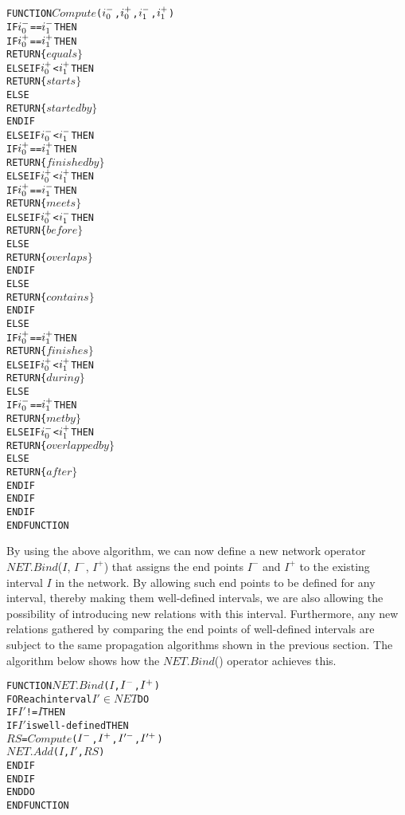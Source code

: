\documentclass[11pt]{report}
\newenvironment{vverbatim}
{
  \begin{alltt}
}
{
  \vspace{-\baselineskip}
  \end{alltt}
}
\begin{document}
        \begin{vverbatim}
  FUNCTION \(Compute\)(\(i\sb{0}\sp{-}\), \(i\sb{0}\sp{+}\), \(i\sb{1}\sp{-}\), \(i\sb{1}\sp{+}\))
    IF \(i\sb{0}\sp{-}\) == \(i\sb{1}\sp{-}\) THEN
      IF \(i\sb{0}\sp{+}\) == \(i\sb{1}\sp{+}\) THEN
        RETURN \{\(equals\}\)
      ELSE IF \(i\sb{0}\sp{+}\) < \(i\sb{1}\sp{+}\) THEN
        RETURN \{\(starts\}\)
      ELSE
        RETURN \{\(started by\}\)
      ENDIF 
    ELSE IF \(i\sb{0}\sp{-}\) < \(i\sb{1}\sp{-}\) THEN
      IF \(i\sb{0}\sp{+}\) == \(i\sb{1}\sp{+}\) THEN
        RETURN \{\(finished by\}\)
      ELSE IF \(i\sb{0}\sp{+}\) < \(i\sb{1}\sp{+}\) THEN
        IF \(i\sb{0}\sp{+}\) == \(i\sb{1}\sp{-}\) THEN
          RETURN \{\(meets\}\)
        ELSE IF \(i\sb{0}\sp{+}\) < \(i\sb{1}\sp{-}\) THEN
          RETURN \{\(before\}\)
        ELSE
          RETURN \{\(overlaps\}\)
        ENDIF
      ELSE
        RETURN \{\(contains\}\)
      ENDIF
    ELSE
      IF \(i\sb{0}\sp{+}\) == \(i\sb{1}\sp{+}\) THEN
        RETURN \{\(finishes\}\)
      ELSE IF \(i\sb{0}\sp{+}\) < \(i\sb{1}\sp{+}\) THEN
        RETURN \{\(during\}\)
      ELSE
        IF \(i\sb{0}\sp{-}\) == \(i\sb{1}\sp{+}\) THEN 
          RETURN \{\(met by\}\)
        ELSE IF \(i\sb{0}\sp{-}\) < \(i\sb{1}\sp{+}\) THEN  
          RETURN \{\(overlapped by\}\)
        ELSE
          RETURN \{\(after\}\)
        ENDIF
      ENDIF
    ENDIF
  ENDFUNCTION
        \end{vverbatim}

        By using the above algorithm, we can now define a new network operator
        $NET.Bind$($I$, $I^-$, $I^+$) that assigns the end points $I^-$ and
        $I^+$ to the existing interval $I$ in the network. By allowing such
        end points to be defined for any interval, thereby making them
        well-defined intervals, we are also allowing the possibility of
        introducing new relations with this interval. Furthermore, any new
        relations gathered by comparing the end points of well-defined
        intervals are subject to the same propagation algorithms shown in the
        previous section. The algorithm below shows how the $NET.Bind$()
        operator achieves this.

        \begin{vverbatim}
  FUNCTION \(NET.Bind\)(\(I\), \(I\sp{-}\), \(I\sp{+}\))
    FOR each interval \(I'\) \(\in\) \(NET\) DO
      IF \(I'\) != \(I\) THEN
        IF \(I'\) is well-defined THEN
          \(RS\) = \(Compute\)(\(I\sp{-}\), \(I\sp{+}\), \(I'\sp{-}\), \(I'\sp{+}\))
          \(NET.Add\)(\(I\), \(I'\), \(RS\))
        ENDIF
      ENDIF
    ENDDO
  ENDFUNCTION
        \end{vverbatim}
\end{document}
